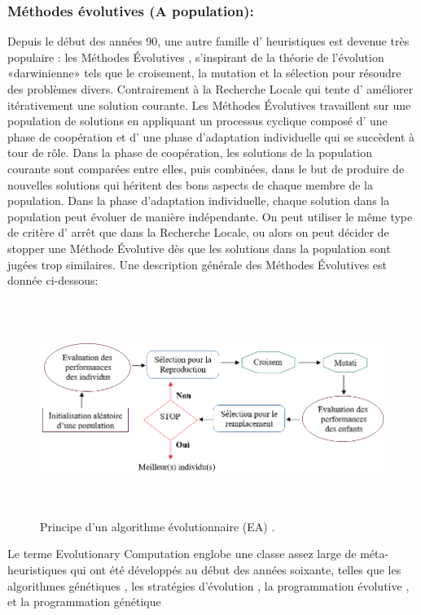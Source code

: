 \subsubsection{Méthodes évolutives (A population):}
Depuis le début des années 90, une autre famille d’ heuristiques est devenue très populaire : les Méthodes Évolutives \cite{hertz2000framework} , s’inspirant de la théorie de l’évolution «darwinienne»  tels que le croisement, la mutation et la sélection pour résoudre des problèmes divers. Contrairement à la Recherche Locale qui tente d’ améliorer itérativement une solution courante. Les Méthodes Évolutives travaillent sur une population de solutions en appliquant un processus cyclique composé d’ une phase de coopération et d’ une phase d’adaptation individuelle qui se succèdent à tour de rôle. Dans la phase de coopération, les solutions de la population courante sont comparées entre elles, puis combinées, dans le but de produire de nouvelles solutions qui héritent des bons aspects de chaque membre de la population. Dans la phase d’adaptation individuelle, chaque solution dans la population peut évoluer de manière indépendante. On peut utiliser le même type de critère d’ arrêt que dans la Recherche Locale, ou alors on peut décider de stopper une Méthode Évolutive dès que les solutions dans la population sont jugées trop similaires. Une description générale des Méthodes Évolutives est donnée ci-dessous:

\begin{figure}[H]
	\centering
	\includegraphics[width=15cm,height=7cm]{Chap3/5.png}
	\caption{Principe d’un algorithme évolutionnaire (EA) \cite{dreo2003metaheuristiques}.}
	\label{fig:CSF}
\end{figure}

Le terme Evolutionary Computation englobe une classe assez large de méta-heuristiques qui ont été développés au début des années soixante, telles que les algorithmes génétiques \cite{holland1975adaptation}, les stratégies d’évolution \cite{rechenberg1973evolutionsstrategie} , la programmation évolutive \cite{fogel1966artificial}, et la programmation génétique \cite{koza1992genetic}

